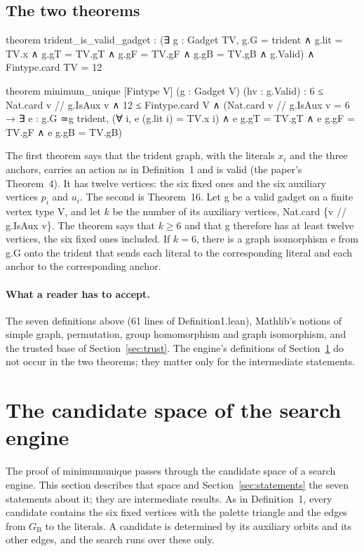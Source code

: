 \documentclass[11pt,a4paper]{article}
\newcommand{\leanus}{\textunderscore\allowbreak}
\newcommand{\lean}[1]{{\ttfamily\let\_\leanus #1}}
\newcommand{\GB}{G_{\mathrm{B}}}
\theoremstyle{definition}
\begin{document}
\subsection{The two theorems}
\begin{code}
theorem trident_is_valid_gadget :
    (∃ g : Gadget TV, g.G = trident ∧ g.lit = TV.x ∧ g.gT = TV.gT ∧
      g.gF = TV.gF ∧ g.gB = TV.gB ∧ g.Valid) ∧ Fintype.card TV = 12

theorem minimum_unique [Fintype V] (g : Gadget V) (hv : g.Valid) :
    6 ≤ Nat.card {v // g.IsAux v} ∧ 12 ≤ Fintype.card V ∧
    (Nat.card {v // g.IsAux v} = 6 → ∃ e : g.G ≃g trident,
      (∀ i, e (g.lit i) = TV.x i) ∧
      e g.gT = TV.gT ∧ e g.gF = TV.gF ∧ e g.gB = TV.gB)
\end{code}
The first theorem says that the trident graph, with the literals $x_i$ and
the three anchors, carries an action as in Definition~1 and is valid (the
paper's Theorem~4). It has twelve vertices: the six fixed ones and the six
auxiliary vertices $p_i$ and $u_i$. The second is Theorem~16. Let
\lean{g} be a valid gadget on a finite vertex type \lean{V}, and let $k$ be
the number of its auxiliary vertices, \lean{Nat.card \{v // g.IsAux v\}}.
The theorem says that $k\ge6$ and that \lean{g} therefore has at least twelve
vertices, the six fixed ones included. If $k=6$, there is a graph
isomorphism \lean{e} from \lean{g.G} onto the trident that sends each literal
to the corresponding literal and each anchor to the corresponding anchor.

\paragraph{What a reader has to accept.} The seven definitions above (61 lines
of \lean{Definition1.lean}), Mathlib's notions of simple graph, permutation,
group homomorphism and graph isomorphism, and the trusted base of
Section~\ref{sec:trust}. The engine's definitions of Section~\ref{sec:model}
do not occur in the two theorems; they matter only for the intermediate
statements.

\section{The candidate space of the search engine}\label{sec:model}

The proof of \lean{minimum\_unique} passes through the candidate space of a
search engine. This section describes that space and Section~\ref{sec:statements}
the seven statements about it; they are intermediate results. As in
Definition~1, every candidate contains the six fixed vertices with the
palette triangle and the edges from $\GB$ to the literals. A candidate is
determined by its auxiliary orbits and its other edges, and the search runs
over these only.
\end{document}
